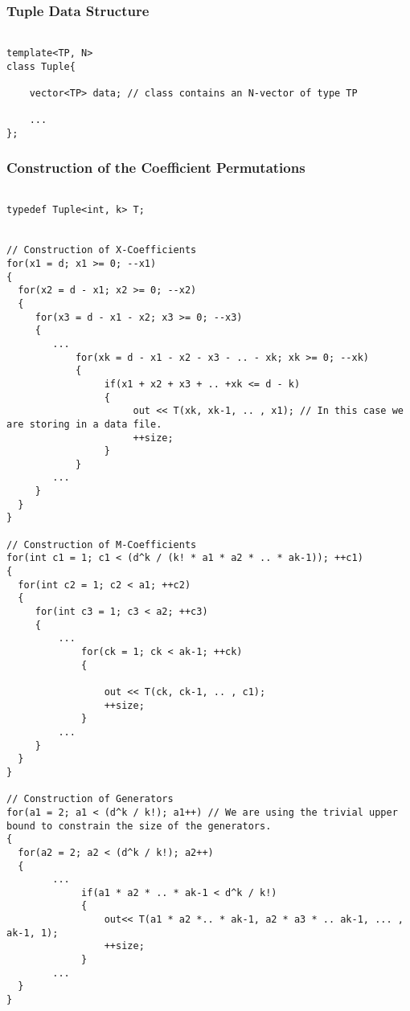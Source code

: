\subsubsection*{Tuple Data Structure}

\begin{lstlisting}

template<TP, N>
class Tuple{

    vector<TP> data; // class contains an N-vector of type TP

    ...
};

\end{lstlisting}

\subsubsection*{Construction of the Coefficient Permutations}

\begin{lstlisting}

typedef Tuple<int, k> T;


// Construction of X-Coefficients
for(x1 = d; x1 >= 0; --x1)
{
  for(x2 = d - x1; x2 >= 0; --x2)
  {
     for(x3 = d - x1 - x2; x3 >= 0; --x3) 
     {
        ...
            for(xk = d - x1 - x2 - x3 - .. - xk; xk >= 0; --xk)
            {
                 if(x1 + x2 + x3 + .. +xk <= d - k)
                 {
                      out << T(xk, xk-1, .. , x1); // In this case we are storing in a data file.
                      ++size;
                 }
            }
        ...
     }	
  }
}

// Construction of M-Coefficients
for(int c1 = 1; c1 < (d^k / (k! * a1 * a2 * .. * ak-1)); ++c1)
{
  for(int c2 = 1; c2 < a1; ++c2)
  {
     for(int c3 = 1; c3 < a2; ++c3)
     {
         ...
             for(ck = 1; ck < ak-1; ++ck)
             {

                 out << T(ck, ck-1, .. , c1);
                 ++size;
             }
         ...
     }
  }
}

// Construction of Generators
for(a1 = 2; a1 < (d^k / k!); a1++) // We are using the trivial upper bound to constrain the size of the generators.
{
  for(a2 = 2; a2 < (d^k / k!); a2++)
  {
        ...
             if(a1 * a2 * .. * ak-1 < d^k / k!)
             {
                 out<< T(a1 * a2 *.. * ak-1, a2 * a3 * .. ak-1, ... , ak-1, 1);
                 ++size;
             }
        ...
  }
}


\end{lstlisting}

